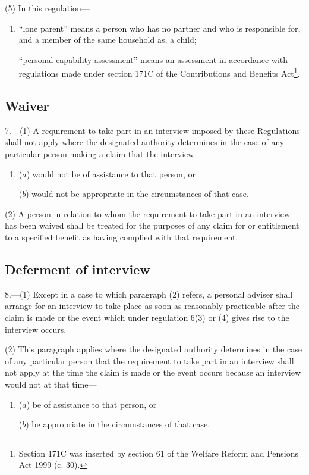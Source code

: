 \documentclass[12pt,a4paper]{article}
\begin{document}
(5) In this regulation—
\begin{enumerate}\item[]
“lone parent” means a person who has no partner and who is responsible for, and a member of the same household as, a child;

“personal capability assessment” means an assessment in accordance with regulations made under section 171C of the Contributions and Benefits Act\footnote{\frenchspacing Section 171C was inserted by section 61 of the Welfare Reform and Pensions Act 1999 (c. 30).}.
\end{enumerate}

\subsection[7. Waiver]{Waiver}

7.---(1)  A requirement to take part in an interview imposed by these Regulations shall not apply where the designated authority determines in the case of any particular person making a claim that the interview—
\begin{enumerate}\item[]
($a$) would not be of assistance to that person, or

($b$) would not be appropriate in the circumstances of that case.
\end{enumerate}

(2) A person in relation to whom the requirement to take part in an interview has been waived shall be treated for the purposes of any claim for or entitlement to a specified benefit as having complied with that requirement.

\subsection[8. Deferment of interview]{Deferment of interview}

8.---(1)  Except in a case to which paragraph (2) refers, a personal adviser shall arrange for an interview to take place as soon as reasonably practicable after the claim is made or the event which under regulation 6(3) or (4) gives rise to the interview occurs.

(2) This paragraph applies where the designated authority determines in the case of any particular person that the requirement to take part in an interview shall not apply at the time the claim is made or the event occurs because an interview would not at that time—
\begin{enumerate}\item[]
($a$) be of assistance to that person, or

($b$) be appropriate in the circumstances of that case.
\end{enumerate}
\end{document}
